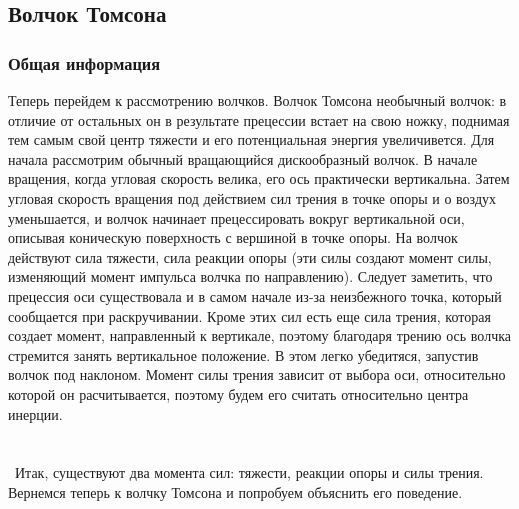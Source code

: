 \documentclass[a4paper, 12pt]{article}
\begin{document}
\subsection{Волчок Томсона}

\subsubsection{Общая информация}
Теперь перейдем к рассмотрению волчков. Волчок Томсона необычный волчок: в  отличие от остальных он в результате прецессии встает на свою ножку, поднимая тем самым свой центр тяжести и его потенциальная энергия увеличивется.\newline
Для начала рассмотрим обычный вращающийся дискообразный волчок. В начале вращения, когда угловая скорость велика, его ось практически вертикальна. Затем угловая скорость вращения под действием сил трения в точке опоры и о воздух уменьшается, и волчок начинает прецессировать вокруг вертикальной оси, описывая коническую поверхность с вершиной в точке опоры. На волчок действуют сила тяжести, сила реакции опоры (эти силы создают момент силы, изменяющий момент импульса волчка по направлению). Следует заметить, что прецессия оси существовала и в самом начале из-за неизбежного точка, который сообщается при раскручивании. \newline
Кроме этих сил есть еще сила трения, которая создает момент, направленный к вертикале, поэтому благодаря трению ось волчка стремится занять вертикальное положение. В этом легко убедитяся, запустив волчок под наклоном. Момент силы трения зависит от выбора оси, относительно которой он расчитывается, поэтому будем его считать относительно центра инерции.
\\\
\\\
\\\
Итак, существуют два момента сил: тяжести, реакции опоры и силы трения.
Вернемся теперь к волчку Томсона и попробуем объяснить его поведение.
\end{document}
